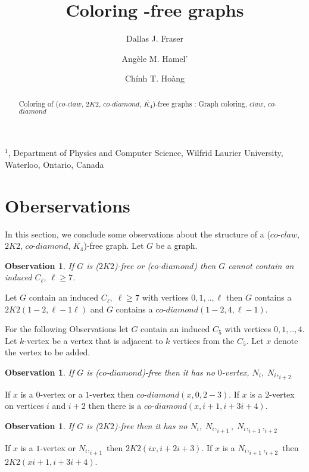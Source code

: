 \documentclass[12pt]{article}
\title{Coloring {\CCD}-free graphs}
\author{
	Dallas J. Fraser\inst{1}
	\and Ang\`ele M. Hamel'\inst{1}
	\and Ch\'inh T. Ho\`ang\inst{1}
}
\newtheorem{Observation}[Theorem]{Observation}
\def\inst#1{$^{#1}$}
\def\FAMILY{($co$-$claw$, $2K2$, $co$-$diamond$, $\overline{K_4}$)}
\begin{document}
\maketitle

\begin{center}
{\footnotesize

\inst{1}, Department of Physics and Computer Science, Wilfrid Laurier
University, \\Waterloo, Ontario, Canada}

\end{center}

\begin{abstract}
Coloring of {\FAMILY}-free graphs
: Graph coloring, $claw$, $co$-$diamond$
\end{abstract}

\section{Oberservations}\label{sec:observations}
In this section, we conclude some observations about the structure of a {\FAMILY}-free graph. Let $G$ be a graph.

\begin{Observation}\label{obs:cycle-less-c7}
If $G$ is ($2K2$)-free or ($co$-$diamond$) then $G$ cannot contain an induced $C_\ell$, $\ell \geq 7$.
\end{Observation}
 Let $G$ contain an induced $C_\ell, \; \ell \geq 7$ with vertices $0, 1, .. , \ell$ then $G$ contains a $2K2 (1-2, \ell-1\ell)$ and $G$ contains a $co$-$diamond (1-2, 4, \ell-1)$.

For the following Observations let $G$ contain an induced $C_5$ with vertices $0, 1, .., 4$. Let $k$-vertex be a vertex that is adjacent to $k$ vertices from the $C_5$. Let $x$ denote the vertex to be added.

\begin{Observation}\label{obs:co-diamond-k}
If $G$ is ($co$-$diamond$)-free then it has no $0$-vertex, $N_i,\; N_i,_{i+2}$
\end{Observation}
 If $x$ is a $0$-vertex or a $1$-vertex then $co$-$diamond (x, 0, 2-3)$. If $x$ is a $2$-vertex on vertices $i$ and $i+2$ then there is a $co$-$diamond (x, i+1, i+3i+4)$.

\begin{Observation}\label{obs:2k2-k}
If $G$ is ($2K2$)-free then it has no $N_i,\; N_i,_{i+1}, \; N_i,_{i+1},_{i+2}$
\end{Observation}
 If $x$ is a $1$-vertex or $N_i,_{i+1}$ then $2K2 (ix, i+2i+3)$. If $x$ is a $N_i,_{i+1},_{i+2}$ then $2K2 (xi+1, i+3i+4)$.
\end{document}
